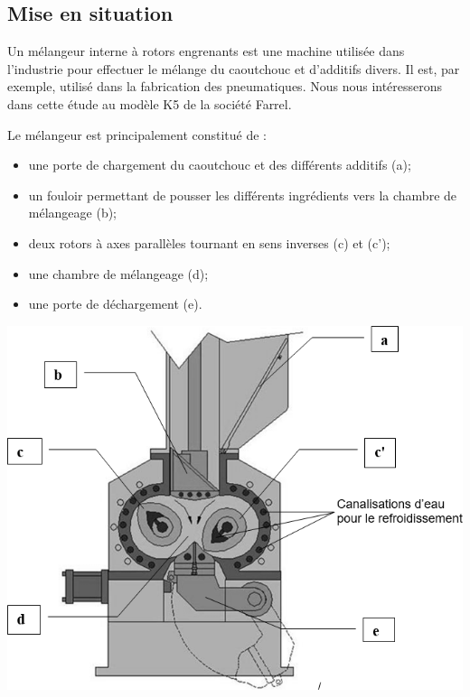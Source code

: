 \documentclass[10pt,fleqn]{article} %
\begin{document}

\vspace{5cm}
\pagestyle{fancy}
\thispagestyle{plain}

\def\columnseprulecolor{\color{ocre}}
\setlength{\columnseprule}{0.4pt} 


\begin{multicols}{2}

\subsection*{Mise en situation}


%
Un mélangeur interne à rotors engrenants est une machine utilisée dans l'industrie pour effectuer le mélange du caoutchouc et d'additifs divers. Il est, par exemple, utilisé dans la fabrication des pneumatiques.
Nous nous intéresserons dans cette étude au modèle K5 de la société Farrel.

Le mélangeur est principalement constitué de :
\begin{itemize}
\item une porte de chargement du caoutchouc et des différents additifs (a);
\item un fouloir permettant de pousser les différents ingrédients vers la chambre de mélangeage (b);
\item deux rotors à axes parallèles tournant en sens inverses (c) et (c');
\item une chambre de mélangeage (d);
\item une porte de déchargement (e).
\end{itemize}

\begin{center}
\includegraphics[width=.7\linewidth]{images/e3a_11}
\end{center}


\end{multicols}
\end{document}
